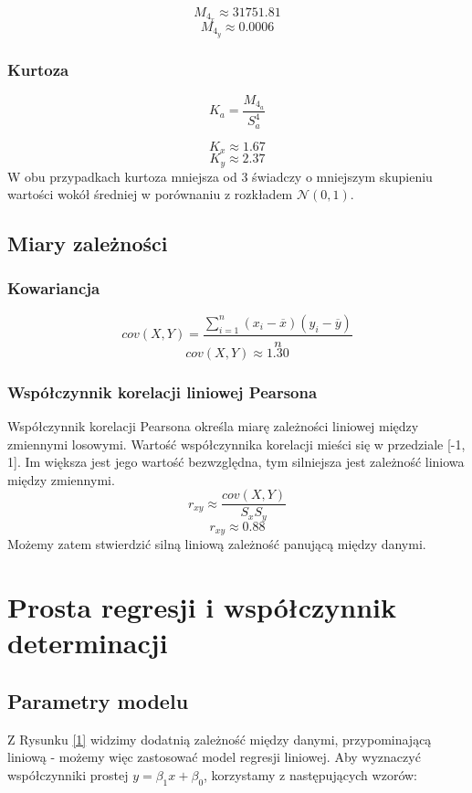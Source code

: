 \documentclass[fleqn]{article}
\begin{document}

    $$M_{4_{x}} \approx 31751.81$$
    $$M_{4_{y}} \approx 0.0006$$

    \subsubsection{Kurtoza}

    $$K_a = \frac{M_{4_a}}{S_a^4}$$ 
    

    $$K_{x} \approx 1.67$$
    $$K_{y} \approx  2.37 $$
    W obu przypadkach kurtoza mniejsza od 3 świadczy o mniejszym skupieniu wartości wokół średniej w porównaniu z
    rozkładem $\mathcal{N}(0,1)$.
	\subsection{Miary zależności}
	\subsubsection{Kowariancja}

	$$
	cov(X,Y) = \frac{\sum_{i=1}^n(x_i-\overline{x} )(y_i-\overline{y} )}{n}
	$$
	$$
	cov(X,Y) \approx 1.30
	$$
	
	\subsubsection{Współczynnik korelacji liniowej Pearsona}
		Współczynnik korelacji Pearsona określa miarę zależności liniowej między zmiennymi losowymi. 
	Wartość współczynnika korelacji mieści się w przedziale [-1, 1]. 
	Im większa jest jego wartość bezwzględna, tym silniejsza jest zależność liniowa między zmiennymi. 
	$$
	r_{xy} \approx \frac{cov(X,Y)}{S_x S_y}
	$$
	$$
	r_{xy} \approx 0.88
	$$
	Możemy zatem stwierdzić silną liniową zależność panującą między danymi.
	
    \section{Prosta regresji i współczynnik determinacji}
    \subsection{Parametry modelu}
    Z Rysunku \ref{1} widzimy dodatnią zależność między danymi, przypominającą liniową - możemy więc zastosować model regresji liniowej.
    Aby wyznaczyć współczynniki prostej $y=\beta_{1}x+\beta_{0}$, korzystamy z następujących wzorów:
\end{document}
